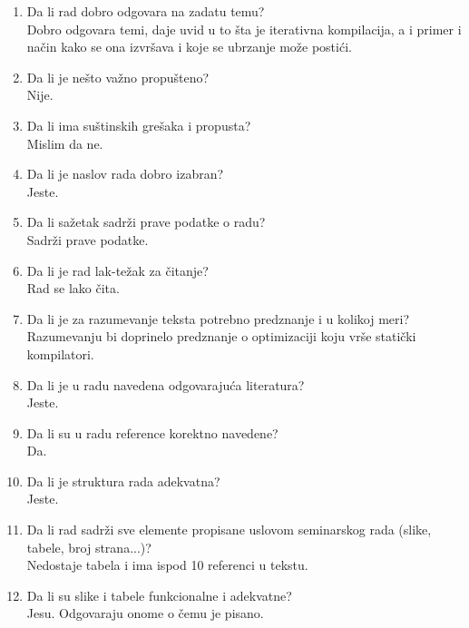 \documentclass[a4paper]{report}
\begin{document}
\begin{enumerate}
\item Da li rad dobro odgovara na zadatu temu?\\
Dobro odgovara temi, daje uvid u to šta je iterativna kompilacija, a i primer i način kako se ona izvršava i koje se ubrzanje može postići. 

\item Da li je nešto važno propušteno?\\
Nije.

\item Da li ima suštinskih grešaka i propusta?\\
Mislim da ne.

\item Da li je naslov rada dobro izabran?\\
Jeste.

\item Da li sažetak sadrži prave podatke o radu?\\
Sadrži prave podatke.

\item Da li je rad lak-težak za čitanje?\\
Rad se lako čita.

\item Da li je za razumevanje teksta potrebno predznanje i u kolikoj meri?\\
Razumevanju bi doprinelo predznanje o optimizaciji koju vrše statički kompilatori.

\item Da li je u radu navedena odgovarajuća literatura?\\
Jeste.

\item Da li su u radu reference korektno navedene?\\
Da.

\item Da li je struktura rada adekvatna?\\
Jeste.

\item Da li rad sadrži sve elemente propisane uslovom seminarskog rada (slike, tabele, broj strana...)?\\
Nedostaje tabela i ima ispod 10 referenci u tekstu.

\item Da li su slike i tabele funkcionalne i adekvatne?\\
Jesu. Odgovaraju onome o čemu je pisano.

\end{enumerate}
\end{document}
